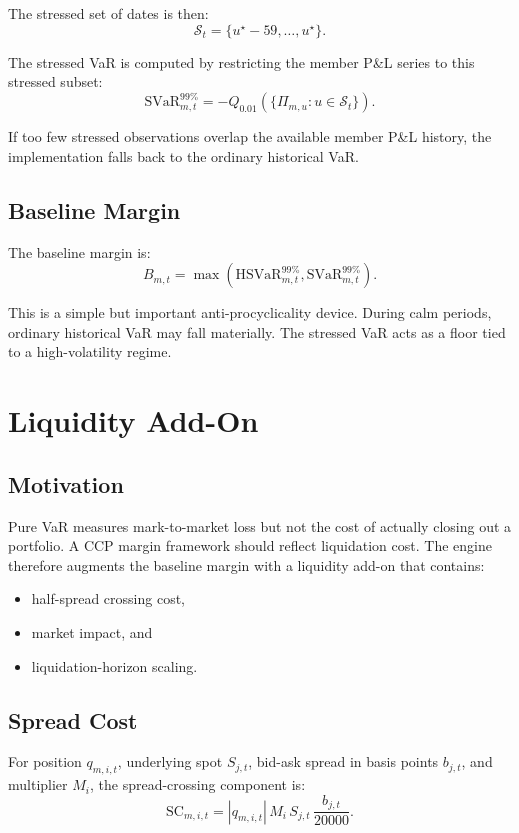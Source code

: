\documentclass[11pt]{article}
\begin{document}
The stressed set of dates is then:
\[
\mathcal{S}_t = \{u^{\star}-59,\dots,u^{\star}\}.
\]

The stressed VaR is computed by restricting the member P\&L series to this stressed subset:
\[
\text{SVaR}_{m,t}^{99\%}
=
-Q_{0.01}\left(\{\Pi_{m,u}: u \in \mathcal{S}_t\}\right).
\]

If too few stressed observations overlap the available member P\&L history, the implementation falls back to the ordinary historical VaR.

\subsection{Baseline Margin}

The baseline margin is:
\[
B_{m,t} = \max\left(\text{HSVaR}_{m,t}^{99\%}, \text{SVaR}_{m,t}^{99\%}\right).
\]

This is a simple but important anti-procyclicality device. During calm periods, ordinary historical VaR may fall materially. The stressed VaR acts as a floor tied to a high-volatility regime.

\section{Liquidity Add-On}

\subsection{Motivation}

Pure VaR measures mark-to-market loss but not the cost of actually closing out a portfolio. A CCP margin framework should reflect liquidation cost. The engine therefore augments the baseline margin with a liquidity add-on that contains:

\begin{itemize}
    \item half-spread crossing cost,
    \item market impact, and
    \item liquidation-horizon scaling.
\end{itemize}

\subsection{Spread Cost}

For position \(q_{m,i,t}\), underlying spot \(S_{j,t}\), bid-ask spread in basis points \(b_{j,t}\), and multiplier \(M_i\), the spread-crossing component is:
\[
\text{SC}_{m,i,t}
=
|q_{m,i,t}|\,M_i\,S_{j,t}\,\frac{b_{j,t}}{20000}.
\]
\end{document}
